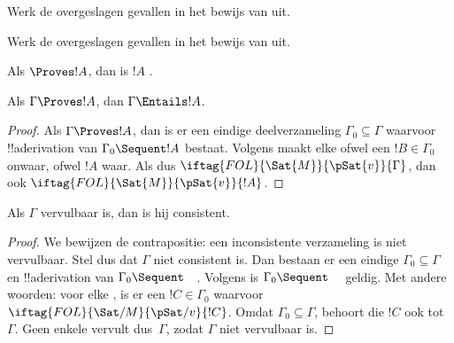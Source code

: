 \documentclass[../../../include/open-logic-section]{subfiles}
\begin{document}
\begin{prob}
Werk de overgeslagen gevallen in het bewijs van
 uit.
\end{prob}
\tagendprob

\begin{prob}
Werk de overgeslagen gevallen in het bewijs van
 uit.
\end{prob}
\tagendprob

\begin{cor}
Als $\Proves !A$, dan is $!A$ .
\end{cor}

\begin{cor}
Als $\Gamma \Proves !A$, dan $\Gamma \Entails !A$.
\end{cor}

\begin{proof}
Als $\Gamma \Proves !A$, dan is er een eindige deelverzameling
$\Gamma_0 \subseteq \Gamma$ waarvoor !!a{derivation} van
$\Gamma_0 \Sequent !A$ bestaat. Volgens
 maakt elke
ofwel een $!B \in \Gamma_0$ onwaar, ofwel $!A$ waar. Als dus
$\iftag{FOL}{\Sat{M}}{\pSat{v}}{\Gamma}$, dan ook
$\iftag{FOL}{\Sat{M}}{\pSat{v}}{!A}$.
\end{proof}

\begin{cor}
Als $\Gamma$ vervulbaar is, dan is hij consistent.
\end{cor}

\begin{proof}
We bewijzen de contrapositie: een inconsistente verzameling is niet
vervulbaar. Stel dus dat $\Gamma$ niet consistent is.
Dan bestaan er een eindige $\Gamma_0 \subseteq \Gamma$ en
!!a{derivation} van $\Gamma_0 \Sequent \quad$. Volgens
 is $\Gamma_0 \Sequent \quad$ geldig.
Met andere woorden: voor elke
,
is er een $!C \in \Gamma_0$ waarvoor
$\iftag{FOL}{\Sat/{M}}{\pSat/{v}}{!C}$. Omdat $\Gamma_0 \subseteq
\Gamma$, behoort die $!C$ ook tot~$\Gamma$. Geen enkele
 vervult dus~$\Gamma$, zodat
$\Gamma$ niet vervulbaar is.
\end{proof}
\end{document}
